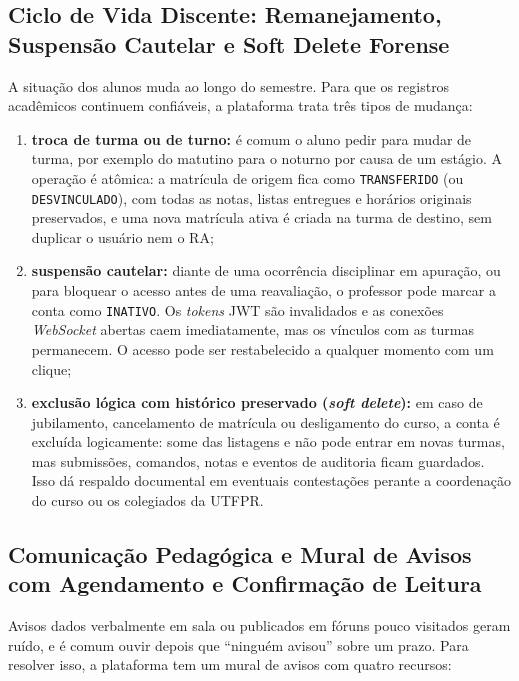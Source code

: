 \subsection{Ciclo de Vida Discente: Remanejamento, Suspensão Cautelar e Soft Delete Forense}
\label{sec:ciclo-vida-discente}

A situação dos alunos muda ao longo do semestre. Para que os registros acadêmicos continuem confiáveis, a plataforma trata três tipos de mudança:

\begin{enumerate}
    \item \textbf{troca de turma ou de turno:} é comum o aluno pedir para mudar de turma, por exemplo do matutino para o noturno por causa de um estágio. A operação é atômica: a matrícula de origem fica como \texttt{TRANSFERIDO} (ou \texttt{DESVINCULADO}), com todas as notas, listas entregues e horários originais preservados, e uma nova matrícula ativa é criada na turma de destino, sem duplicar o usuário nem o RA;
    \item \textbf{suspensão cautelar:} diante de uma ocorrência disciplinar em apuração, ou para bloquear o acesso antes de uma reavaliação, o professor pode marcar a conta como \texttt{INATIVO}. Os \textit{tokens} JWT são invalidados e as conexões \textit{WebSocket} abertas caem imediatamente, mas os vínculos com as turmas permanecem. O acesso pode ser restabelecido a qualquer momento com um clique;
    \item \textbf{exclusão lógica com histórico preservado (\textit{soft delete}):} em caso de jubilamento, cancelamento de matrícula ou desligamento do curso, a conta é excluída logicamente: some das listagens e não pode entrar em novas turmas, mas submissões, comandos, notas e eventos de auditoria ficam guardados. Isso dá respaldo documental em eventuais contestações perante a coordenação do curso ou os colegiados da UTFPR.
\end{enumerate}

\subsection{Comunicação Pedagógica e Mural de Avisos com Agendamento e Confirmação de Leitura}
\label{sec:mural-avisos}

Avisos dados verbalmente em sala ou publicados em fóruns pouco visitados geram ruído, e é comum ouvir depois que ``ninguém avisou'' sobre um prazo. Para resolver isso, a plataforma tem um mural de avisos com quatro recursos:

